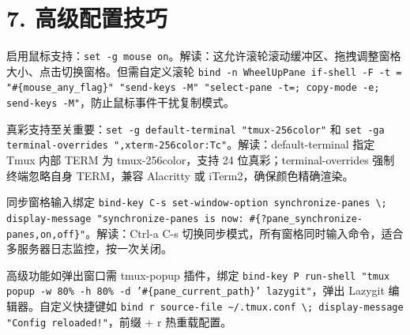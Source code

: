 \chapter{7. 高级配置技巧}
启用鼠标支持：\texttt{set -g mouse on}。解读：这允许滚轮滚动缓冲区、拖拽调整窗格大小、点击切换窗格。但需自定义滚轮 \texttt{bind -n WheelUpPane if-shell -F -t = "\#{}\{{}mouse\_{}any\_{}flag\}{}" "send-keys -M" "select-pane -t=; copy-mode -e; send-keys -M"}，防止鼠标事件干扰复制模式。\par
真彩支持至关重要：\texttt{set -g default-terminal "tmux-256color"} 和 \texttt{set -ga terminal-overrides ",xterm-256color:Tc"}。解读：default-terminal 指定 Tmux 内部 TERM 为 tmux-256color，支持 24 位真彩；terminal-overrides 强制终端忽略自身 TERM，兼容 Alacritty 或 iTerm2，确保颜色精确渲染。\par
同步窗格输入绑定 \texttt{bind-key C-s set-window-option synchronize-panes \textbackslash{}; display-message "synchronize-panes is now: \#{}\{{}?pane\_{}synchronize-panes,on,off\}{}"}。解读：Ctrl-a C-s 切换同步模式，所有窗格同时输入命令，适合多服务器日志监控，按一次关闭。\par
高级功能如弹出窗口需 tmux-popup 插件，绑定 \texttt{bind-key P run-shell "tmux popup -w 80\%{} -h 80\%{} -d '\#{}\{{}pane\_{}current\_{}path\}{}' lazygit"}，弹出 Lazygit 编辑器。自定义快捷键如 \texttt{bind r source-file \~{}/.tmux.conf \textbackslash{}; display-message "Config reloaded!"}，前缀 + r 热重载配置。\par
